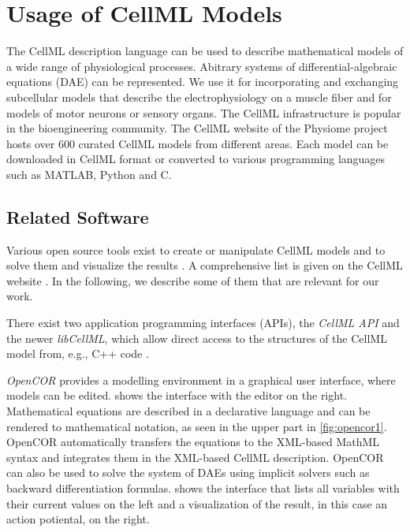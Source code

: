 
\section{Usage of CellML Models}\label{sec:usage_cellml}

The CellML description language can be used to describe mathematical models of a wide range of physiological processes. Abitrary systems of differential-algebraic equations (DAE) can be represented.
We use it for incorporating and exchanging subcellular models that describe the electrophysiology on a muscle fiber and for models of motor neurons or sensory organs.
The CellML infrastructure is popular in the bioengineering community. The CellML website of the Physiome project hosts over 600 curated CellML models from different areas. Each model can be downloaded in CellML format or converted to various programming languages such as MATLAB, Python and C.

\subsection{Related Software}\label{sec:cellml_related_software}

Various open source tools exist to create or manipulate CellML models and to solve them and visualize the results \cite{pmid18579471}. A comprehensive list is given on the CellML website \cite{cellmlWebsite}. In the following, we describe some of them that are relevant for our work.

There exist two application programming interfaces (APIs), the \emph{CellML API} and the newer \emph{libCellML}, which allow direct access to the structures of the CellML model from, e.g., C++ code \cite{pmid20377909}. 

\emph{OpenCOR} \cite{OpenCOR2015} provides a modelling environment in a graphical user interface, where models can be edited. 
 shows the interface with the editor on the right. Mathematical equations are described in a declarative language and can be rendered to mathematical notation, as seen in the upper part in \cref{fig:opencor1}. OpenCOR automatically transfers the equations to the XML-based MathML syntax and integrates them in the XML-based CellML description.
OpenCOR can also be used to solve the system of DAEs using implicit solvers such as backward differentiation formulas.  shows the interface that lists all variables with their current values on the left and a visualization of the result, in this case an action potiental, on the right.

